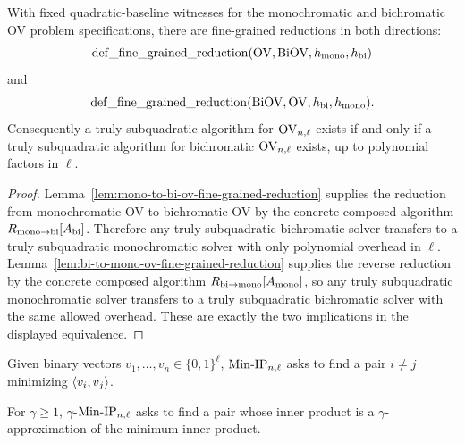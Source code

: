 \begin{lemma}
  \label{lem:mono-bi-ov-equiv}
  With fixed quadratic-baseline witnesses for the monochromatic and
  bichromatic OV problem specifications, there are fine-grained reductions in
  both directions:
  \[
    \operatorname{def\_fine\_grained\_reduction}
      (\mathrm{OV},\operatorname{BiOV},h_{\rm mono},h_{\rm bi})
  \]
  and
  \[
    \operatorname{def\_fine\_grained\_reduction}
      (\operatorname{BiOV},\mathrm{OV},h_{\rm bi},h_{\rm mono}).
  \]
  Consequently a truly subquadratic algorithm for $\mathrm{OV}_{n,\ell}$ exists if and
  only if a truly subquadratic algorithm for bichromatic $\mathrm{OV}_{n,\ell}$ exists,
  up to polynomial factors in $\ell$.
\end{lemma}
\begin{proof}
  Lemma~\ref{lem:mono-to-bi-ov-fine-grained-reduction} supplies the reduction
  from monochromatic OV to bichromatic OV by the concrete composed algorithm
  $R_{\rm mono\to bi}[A_{\rm bi}]$.  Therefore any truly subquadratic
  bichromatic solver transfers to a truly subquadratic monochromatic solver
  with only polynomial overhead in $\ell$.  Lemma~\ref{lem:bi-to-mono-ov-fine-grained-reduction}
  supplies the reverse reduction by the concrete composed algorithm
  $R_{\rm bi\to mono}[A_{\rm mono}]$, so any truly subquadratic monochromatic
  solver transfers to a truly subquadratic bichromatic solver with the same
  allowed overhead.  These are exactly the two implications in the displayed
  equivalence.
\end{proof}

\begin{definition}
  \label{def:min-ip}
  Given binary vectors $v_1,\ldots,v_n\in\{0,1\}^{\ell}$,
  $\mathrm{Min\mbox{-}IP}_{n,\ell}$ asks to find a pair $i\neq j$ minimizing $\left\langle v_i,v_j\right\rangle$.
\end{definition}

\begin{definition}
  \label{def:gamma-min-ip}
  For $\gamma\geq 1$, $\gamma$-$\mathrm{Min\mbox{-}IP}_{n,\ell}$ asks to find a pair whose inner
  product is a $\gamma$-approximation of the minimum inner product.
\end{definition}

